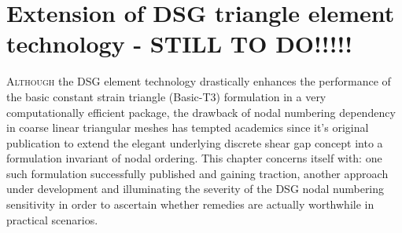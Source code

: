 



\chapter{Extension of DSG triangle element technology - STILL TO DO!!!!!}
\label{chap:chapter_application}

\renewcommand{\Thema}{Extension of DSG triangle element technology}

\lettrine[lines=2]{A}{lthough} the DSG element technology drastically enhances the performance of the basic constant strain triangle (Basic-T3) formulation in a very computationally efficient package, the drawback of nodal numbering dependency in coarse linear triangular meshes has tempted academics since it's original publication to extend the elegant underlying discrete shear gap concept into a formulation invariant of nodal ordering. This chapter concerns itself with: one such formulation successfully published and gaining traction, another approach under development and illuminating the severity of the DSG nodal numbering sensitivity in order to ascertain whether remedies are actually worthwhile in practical scenarios.

